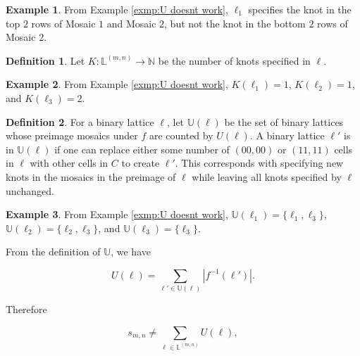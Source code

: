 \documentclass[12pt]{article}
\theoremstyle{plain}
\theoremstyle{definition}
\newtheorem{definition}{Definition}[section]
\theoremstyle{remark}
\theoremstyle{definition}
\newtheorem{exmp}{Example}[section]
\begin{document}
\begin{exmp}
    From Example \ref{exmp:U doesnt work}, $\ell_1$ specifies the knot in the top $2$ rows of Mosaic $1$ and Mosaic $2$, but not the knot in the bottom $2$ rows of Mosaic $2$.
\label{exmp:specifying example}
\end{exmp}

\begin{definition}
    Let $K: \mathbb{L}^{(m,n)} \to \mathbb{N}$ be the number of knots specified in $\ell$.
\end{definition}

\begin{exmp}
    From Example \ref{exmp:U doesnt work}, $K(\ell_1) =1$, $K(\ell_2) =1$,  and $K(\ell_3) =2$.

\label{exmp:counting knots}
\end{exmp}

\begin{definition}
For a binary lattice $\ell$, let $\mathbb{U}(\ell)$ be the set of binary lattices whose preimage mosaics under $f$ are counted by $U(\ell)$. A binary lattice $\ell'$ is in $\mathbb{U}(\ell)$ if one can replace either some number of $(00,00)$ or $(11,11)$ cells in $\ell$ with other cells in $C$ to create $\ell'$. This corresponds with specifying new knots in the mosaics in the preimage of $\ell$ while leaving all knots specified by $\ell$ unchanged. 
\end{definition}

\begin{exmp}
From Example \ref{exmp:U doesnt work}, $\mathbb{U}(\ell_1) = \{\ell_1, \ell_3\}$, $\mathbb{U}(\ell_2) = \{\ell_2, \ell_3\}$, and $\mathbb{U}(\ell_3) = \{\ell_3\}$.


\label{exmp:four two mosaics}
\end{exmp}

From the definition of $\mathbb{U}$, we have

\begin{equation}
    U(\ell) = \sum_{\ell' \in \mathbb{U}(\ell)}|f^{-1}(\ell')|.
    \label{eq:U identity}
\end{equation}

Therefore

$$s_{m,n} \neq \sum_{\ell \in \mathbb{L}^{(m,n)}} U(\ell),$$
\end{document}
